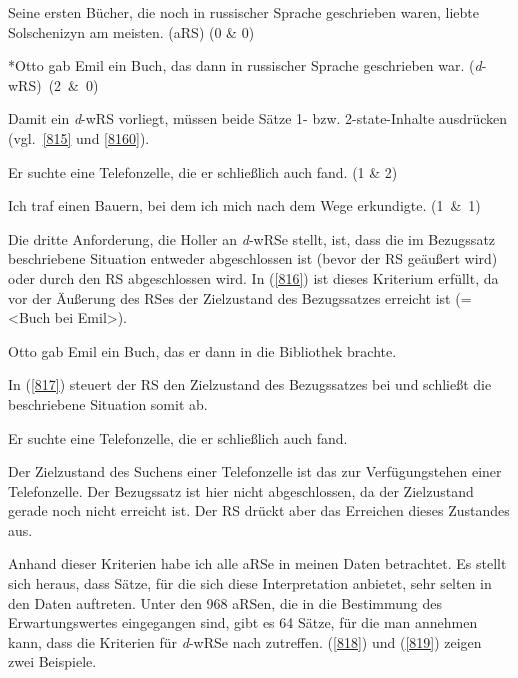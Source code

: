 \begin{exe}
	\ex\label{813} 
	Seine ersten Bücher, die noch in russischer Sprache geschrieben waren, liebte Solschenizyn am meisten. (aRS) (0 \& 0)
\end{exe} 	

\begin{exe}
	\ex\label{814} 
	*Otto gab Emil ein Buch, das dann in russischer Sprache geschrieben war. 
	\newline
	\hbox{}\hfill\hbox{(\textit{d}-wRS) (2 \& 0)}	
	\newline
	\hbox{}\hfill\hbox{\citet[160]{Holler2005}}
\end{exe}
Damit ein \textit{d}-wRS vorliegt, müssen beide Sätze 1- bzw. 2-state-Inhalte ausdrücken (vgl.\ \ref{815} und \ref{8160}).

\begin{exe}
	\ex\label{815} 
	Er suchte eine Telefonzelle, die er schließlich auch fand. (1 \& 2)
\end{exe} 	

\begin{exe}
	\ex\label{8160} 
	Ich traf einen Bauern, bei dem ich mich nach dem Wege erkundigte. 
	\newline
	\hbox{}\hfill\hbox{(1 \& 1)}	
\end{exe} 
Die dritte Anforderung, die Holler an \textit{d}-wRSe stellt, ist, dass die im Bezugssatz beschriebene Situation entweder abgeschlossen ist (bevor der RS geäußert wird) oder durch den RS abgeschlossen wird. In (\ref{816}) ist dieses Kriterium erfüllt, da vor der Äußerung des RSes der Zielzustand des Bezugssatzes erreicht ist (= \textless Buch bei Emil\textgreater).

\begin{exe}
	\ex\label{816} 
	Otto gab Emil ein Buch, das er dann in die Bibliothek brachte.
\end{exe} 
In (\ref{817}) steuert der RS den Zielzustand des Bezugssatzes bei und schließt die beschriebene Situation somit ab.

\begin{exe}
	\ex\label{817} 
	Er suchte eine Telefonzelle, die er schließlich auch fand.
\end{exe} 
Der Zielzustand des Suchens einer Telefonzelle ist das zur Verfügungstehen einer Telefonzelle. Der Bezugssatz ist hier nicht abgeschlossen, da der Zielzustand ge\-rade noch nicht erreicht ist. Der RS drückt aber das Erreichen dieses Zustandes aus.

Anhand dieser Kriterien habe ich alle aRSe in meinen Daten betrachtet. Es stellt sich heraus, dass Sätze, für die sich diese Interpretation anbietet, sehr selten in den Daten auftreten. Unter den 968 aRSen, die in die Bestimmung des Erwartungswertes eingegangen sind, gibt es 64 Sätze, für die man annehmen kann, dass die Kriterien für \textit{d}-wRSe nach \citet{Holler2005} zutreffen. (\ref{818}) und (\ref{819}) zeigen zwei Beispiele.

